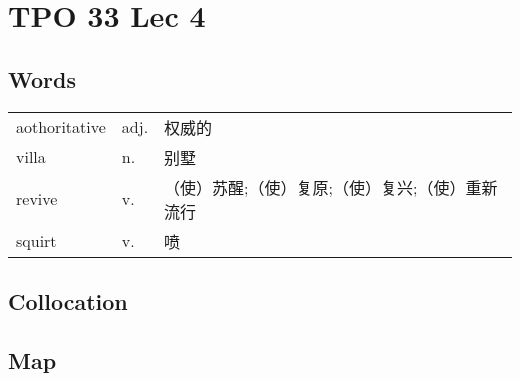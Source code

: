 \section{TPO 33 Lec 4}

\subsection{Words}

\begin{tabular}{lll}
    aothoritative & adj. & 权威的                       \\
    villa         & n.   & 别墅                        \\
    revive        & v.   & （使）苏醒;（使）复原;（使）复兴;（使）重新流行 \\
    squirt        & v.   & 喷                         \\
\end{tabular}

\subsection{Collocation}

\subsection{Map}
